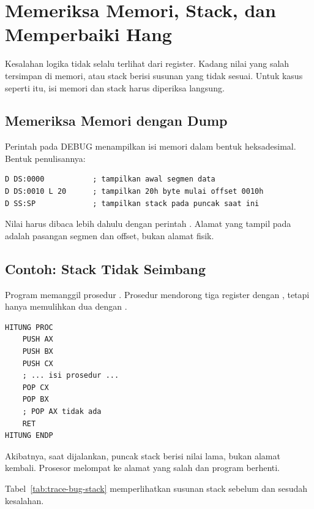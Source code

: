 \section{Memeriksa Memori, Stack, dan Memperbaiki Hang}
\label{sec:dump-stack}

Kesalahan logika tidak selalu terlihat dari register. Kadang nilai
yang salah tersimpan di memori, atau stack berisi susunan yang tidak
sesuai. Untuk kasus seperti itu, isi memori dan stack harus diperiksa
langsung.

\subsection{Memeriksa Memori dengan Dump}

Perintah  pada DEBUG menampilkan isi memori dalam bentuk
heksadesimal. Bentuk penulisannya:

\begin{lstlisting}[language=MASM, numbers=none]
D DS:0000           ; tampilkan awal segmen data
D DS:0010 L 20      ; tampilkan 20h byte mulai offset 0010h
D SS:SP             ; tampilkan stack pada puncak saat ini
\end{lstlisting}

Nilai  harus dibaca lebih dahulu dengan perintah .
Alamat yang tampil pada  adalah pasangan segmen dan offset,
bukan alamat fisik.

\subsection{Contoh: Stack Tidak Seimbang}

Program  memanggil prosedur .
Prosedur mendorong tiga register dengan , tetapi hanya
memulihkan dua dengan .

\begin{lstlisting}[language=MASM, numbers=none]
HITUNG PROC
    PUSH AX
    PUSH BX
    PUSH CX
    ; ... isi prosedur ...
    POP CX
    POP BX
    ; POP AX tidak ada
    RET
HITUNG ENDP
\end{lstlisting}

Akibatnya, saat  dijalankan, puncak stack berisi nilai
 lama, bukan alamat kembali. Prosesor melompat ke alamat yang
salah dan program berhenti.

Tabel~\ref{tab:trace-bug-stack} memperlihatkan susunan stack sebelum
dan sesudah kesalahan.

